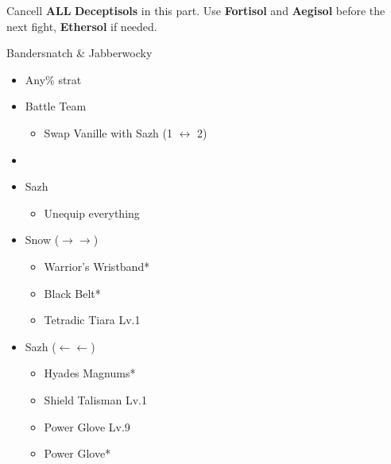 Cancell \textbf{ALL} \textbf{Deceptisols} in this part.
Use \textbf{Fortisol} and \textbf{Aegisol} before the next fight, \textbf{Ethersol} if needed.

\begin{battle}{Bandersnatch \& Jabberwocky}
	\begin{itemize}
		\item Any\% strat
	\end{itemize}
\end{battle}

\begin{menu}
	\begin{itemize}
		\paradigm
		\begin{itemize}
			\item Battle Team
				\begin{itemize}
					\item Swap Vanille with Sazh (1 $\leftrightarrow$ 2)
				\end{itemize}
			\item {}%
				{\paradigmline{\com}{\com}{\com}}%
				{\paradigmline{\com}{(\com)}{\com}}%
				{\paradigmline{(\com)}{(\sab)}{\sen}}%
				{\paradigmline[4]{\syn}{\sab}{\sen}}%
				{\paradigmline{(\com)}{(\med)}{(\sen)}}%
				{\paradigmline{\rav}{\rav}{\rav}}%
		\end{itemize}
		\equip
		\begin{itemize}
			\item Sazh
				\begin{itemize}
					\item Unequip everything
				\end{itemize}
			\item Snow ($\rightarrow\rightarrow$)
				\begin{itemize}
					\item Warrior's Wristband*
					\item Black Belt*
					\item Tetradic Tiara Lv.1
				\end{itemize}
			\item Sazh ($\leftarrow\leftarrow$)
				\begin{itemize}
					\item Hyades Magnums*
					\item Shield Talisman Lv.1
					\item Power Glove Lv.9
					\item Power Glove*
				\end{itemize}								
		\end{itemize}
	\end{itemize}
\end{menu}

